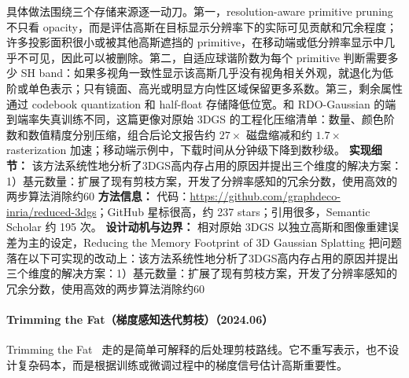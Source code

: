 具体做法围绕三个存储来源逐一动刀。第一，resolution-aware primitive pruning 不只看 opacity，而是评估高斯在目标显示分辨率下的实际可见贡献和冗余程度；许多投影面积很小或被其他高斯遮挡的 primitive，在移动端或低分辨率显示中几乎不可见，因此可以被删除。第二，自适应球谐阶数为每个 primitive 判断需要多少 SH band：如果多视角一致性显示该高斯几乎没有视角相关外观，就退化为低阶或单色表示；只有镜面、高光或明显方向性区域保留更多系数。第三，剩余属性通过 codebook quantization 和 half-float 存储降低位宽。和 RDO-Gaussian 的端到端率失真训练不同，这篇更像对原始 3DGS 的工程化压缩清单：数量、颜色阶数和数值精度分别压缩，组合后论文报告约 $27\times$ 磁盘缩减和约 $1.7\times$ rasterization 加速；移动端示例中，下载时间从分钟级下降到数秒级。
\textbf{实现细节：} 该方法系统性地分析了3DGS高内存占用的原因并提出三个维度的解决方案：1）基元数量：扩展了现有剪枝方案，开发了分辨率感知的冗余分数，使用高效的两步算法消除约60
\textbf{方法信息：} 代码：\url{https://github.com/graphdeco-inria/reduced-3dgs}；GitHub 星标很高，约 237 stars；引用很多，Semantic Scholar 约 195 次。
\textbf{设计动机与边界：} 相对原始 3DGS 以独立高斯和图像重建误差为主的设定，Reducing the Memory Footprint of 3D Gaussian Splatting 把问题落在以下可实现的改动上：该方法系统性地分析了3DGS高内存占用的原因并提出三个维度的解决方案：1）基元数量：扩展了现有剪枝方案，开发了分辨率感知的冗余分数，使用高效的两步算法消除约60%
\paragraph{Trimming the Fat（梯度感知迭代剪枝）（2024.06）}
Trimming the Fat~\cite{2406_18214} 走的是简单可解释的后处理剪枝路线。它不重写表示，也不设计复杂码本，而是根据训练或微调过程中的梯度信号估计高斯重要性。

